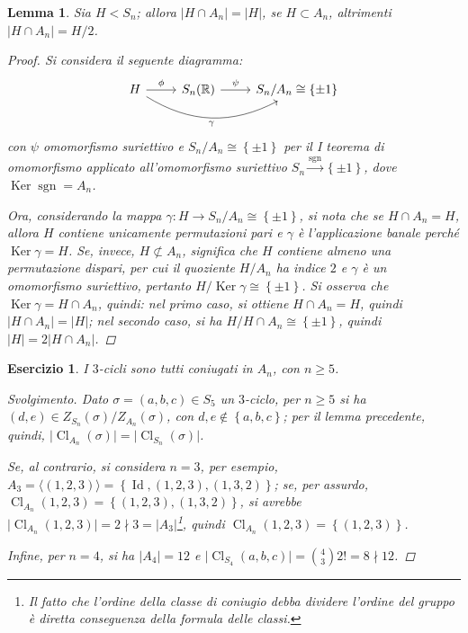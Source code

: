 \documentclass[12pt]{scrartcl}
\theoremstyle{style}
\newtheorem{lemma}{Lemma}[teorema]
\newtheorem{esercizio}{Esercizio}[section]
\newenvironment{svolgimento}{\renewcommand\qedsymbol{$\blacksquare$}\begin{proof}[Svolgimento]}{\end{proof}}
\numberwithin{equation}{subsection}
\begin{document}
\begin{lemma}
	Sia $H < S_n$; allora $ \lvert H \cap  A_n \rvert = |H|$, se $H \subset A_n$, altrimenti $\lvert H \cap A_n \rvert = H / 2$.
	\begin{proof}
		Si considera il seguente diagramma:
	\[
\begin{tikzcd}
H \arrow[r, "\phi "] 
    \arrow[rr, bend right=30, "{\gamma}"'] & 
S_n(\mathbb{R}) \arrow[r, "\psi  "] & S_n / A_n \cong \left\{ \pm 1 \right\} 
\end{tikzcd}
\]
con $\psi  $ omomorfismo suriettivo e $S_n / A_n \cong \left\{ \pm 1 \right\} $ per il I teorema di omomorfismo applicato all'omomorfismo suriettivo $S_n \stackrel{\operatorname{sgn} }{\longrightarrow} \left\{ \pm 1 \right\} $, dove $\operatorname{Ker} \operatorname{sgn}  = A_n$. 

Ora, considerando la mappa $\gamma : H \to S_n / A_n \cong \left\{ \pm 1 \right\} $, si nota che se $H\cap A_n = H$, allora $H$ contiene unicamente permutazioni pari e $\gamma$ \`e l'applicazione banale perch\'e $\operatorname{Ker} \gamma = H$.
Se, invece, $H \not\subset A_n$, significa che $H$ contiene almeno una permutazione dispari, per cui il quoziente $H / A_n$ ha indice $2$ e $\gamma$ \`e un omomorfismo suriettivo, pertanto $H / \operatorname{Ker} \gamma \cong \left\{ \pm 1 \right\} $.
Si osserva che $\operatorname{Ker} \gamma = H \cap A_n$, quindi: nel primo caso, si ottiene $H\cap A_n= H$, quindi $\lvert H\cap A_n \rvert = \lvert H \rvert $; nel secondo caso, si ha $H / H\cap A_n \cong \left\{ \pm 1 \right\} $, quindi $\lvert H \rvert = 2 \lvert H \cap A_n \rvert $.
	\end{proof}
\end{lemma}
\begin{esercizio}
I $3$-cicli sono tutti coniugati in $A_n$, con $n\ge 5$.
\begin{svolgimento}
	Dato $\sigma =(a,b,c) \in S_5$ un $3$-ciclo, per $n\ge 5$ si ha $(d,e) \in Z_{S_n} (\sigma ) / Z_{A_n} (\sigma )$, con $d,e \not \in \left\{ a,b,c \right\} $; per il lemma precedente, quindi, $\lvert \operatorname{Cl} _{A_n} (\sigma ) \rvert = \lvert \operatorname{Cl} _{S_n} (\sigma  )\rvert $.

	Se, al contrario, si considera $n=3$, per esempio, $A_3 = \langle (1,2,3) \rangle=\left\{ \operatorname{Id} , (1,2,3), (1,3,2) \right\} $; se, per assurdo, $\operatorname{Cl} _{A_n} (1,2,3) = \left\{ (1,2,3),(1,3,2) \right\} $, si avrebbe $\lvert \operatorname{Cl} _{A_n} (1,2,3) \rvert = 2 \nmid 3 = \lvert A_3 \rvert $\footnote{Il fatto che l'ordine della classe di coniugio debba dividere l'ordine del gruppo \`e diretta conseguenza della formula delle classi.}, quindi $\operatorname{Cl} _{A_n} (1,2,3) = \left\{ (1,2,3) \right\} $.

	Infine, per $n=4$, si ha $\lvert A_4 \rvert =12$ e $\lvert \operatorname{Cl} _{S_4} (a,b,c) \rvert = \binom{4}{3}2! = 8  \nmid  12$.
\end{svolgimento}
\end{esercizio}
\end{document}
